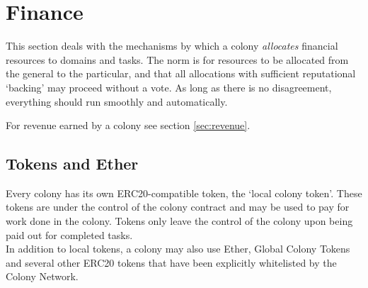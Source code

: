 

\section{Finance}\label{sec:finance}
This section deals with the mechanisms by which a colony \emph{allocates} financial resources to domains and tasks. The norm is for resources to be allocated from the general to the particular, and that all allocations with sufficient reputational `backing' may proceed without a vote. As long as there is no disagreement, everything should run smoothly and automatically.

For revenue earned by a colony see section \ref{sec:revenue}.

\subsection{Tokens and Ether}
Every colony has its own ERC20-compatible token, the `local colony token'. These tokens are under the control of the colony contract and may be used to pay for work done in the colony. Tokens only leave the control of the colony upon being paid out for completed tasks.\\
In addition to local tokens, a colony may also use Ether, Global Colony Tokens and several other ERC20 tokens that have been explicitly whitelisted by the Colony Network.



